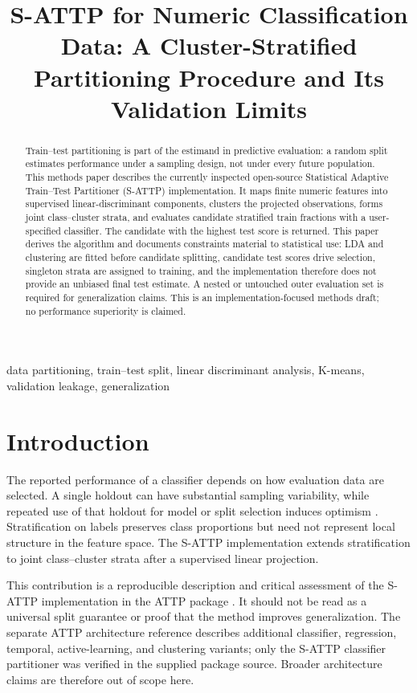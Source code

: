 \documentclass[conference]{IEEEtran}
\title{S-ATTP for Numeric Classification Data: A Cluster-Stratified Partitioning Procedure and Its Validation Limits}
\author{
\jabulaniauthor
\and
\martinchanzauthor
}
\begin{document}
\maketitle

\begin{abstract}
Train--test partitioning is part of the estimand in predictive evaluation: a random split estimates performance under a sampling design, not under every future population. This methods paper describes the currently inspected open-source Statistical Adaptive Train--Test Partitioner (S-ATTP) implementation. It maps finite numeric features into supervised linear-discriminant components, clusters the projected observations, forms joint class--cluster strata, and evaluates candidate stratified train fractions with a user-specified classifier. The candidate with the highest test score is returned. This paper derives the algorithm and documents constraints material to statistical use: LDA and clustering are fitted before candidate splitting, candidate test scores drive selection, singleton strata are assigned to training, and the implementation therefore does not provide an unbiased final test estimate. A nested or untouched outer evaluation set is required for generalization claims. This is an implementation-focused methods draft; no performance superiority is claimed.
\end{abstract}

\begin{IEEEkeywords}
data partitioning, train--test split, linear discriminant analysis, K-means, validation leakage, generalization
\end{IEEEkeywords}

\section{Introduction}
The reported performance of a classifier depends on how evaluation data are selected. A single holdout can have substantial sampling variability, while repeated use of that holdout for model or split selection induces optimism \cite{kohavi1995,arlot2010}. Stratification on labels preserves class proportions but need not represent local structure in the feature space. The S-ATTP implementation extends stratification to joint class--cluster strata after a supervised linear projection.

This contribution is a reproducible description and critical assessment of the S-ATTP implementation in the ATTP package \cite{software}. It should not be read as a universal split guarantee or proof that the method improves generalization. The separate ATTP architecture reference describes additional classifier, regression, temporal, active-learning, and clustering variants; only the S-ATTP classifier partitioner was verified in the supplied package source. Broader architecture claims are therefore out of scope here.
\end{document}
